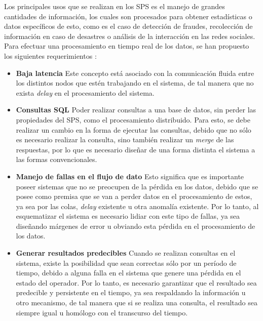 Los principales usos que se realizan en los SPS es el manejo de grandes cantidades de información, los cuales son procesados para obtener estadísticas o datos específicos de esto, como es el caso de detección de fraudes, recolección de información en caso de desastres o análisis de la interacción en las redes sociales. Para efectuar una procesamiento en tiempo real de los datos, se han propuesto los siguientes requerimientos \citep{StonebrakerCZ05}:

\begin{itemize}
	\item \textbf{Baja latencia} Este concepto está asociado con la comunicación fluida entre los distintos nodos que estén trabajando en el sistema, de tal manera que no exista \textit{delay} en el procesamiento del sistema.
	\item \textbf{Consultas SQL} Poder realizar consultas a una base de datos, sin perder las propiedades del SPS, como el procesamiento distribuido. Para esto, se debe realizar un cambio en la forma de ejecutar las consultas, debido que no sólo es necesario realizar la consulta, sino también realizar un \textit{merge} de las respuestas, por lo que es necesario diseñar de una forma distinta el sistema a las formas convencionales.
	\item \textbf{Manejo de fallas en el flujo de dato} Esto significa que es importante poseer sistemas que no se preocupen de la pérdida en los datos, debido que se posee como premisa que se van a perder datos en el procesamiento de estos, ya sea por las colas, \textit{delay} existente u otra anomalía existente. Por lo tanto, al esquematizar el sistema es necesario lidiar con este tipo de fallas, ya sea diseñando márgenes de error u obviando esta pérdida en el procesamiento de los datos.
	\item \textbf{Generar resultados predecibles} %
	Cuando se realizan consultas en el sistema, existe la posibilidad que sean correctas sólo por un período de tiempo, debido a alguna falla en el sistema que genere una pérdida en el estado del operador. Por lo tanto, es necesario garantizar que el resultado sea predecible y persistente en el tiempo, ya sea respaldando la información u otro mecanismo, de tal manera que si se realiza una consulta, el resultado sea siempre igual u homólogo con el transcurso del tiempo.

\end{itemize}
